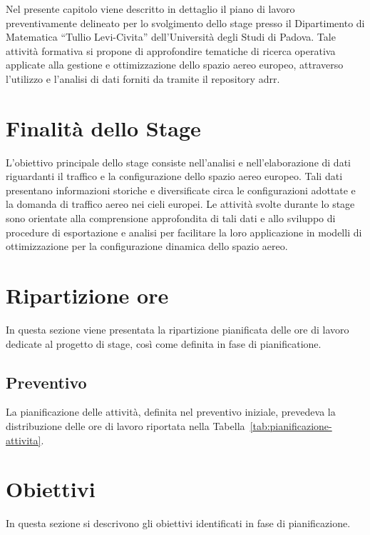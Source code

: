 Nel presente capitolo viene descritto in dettaglio il piano di lavoro preventivamente delineato per lo svolgimento dello stage presso il Dipartimento di Matematica ``Tullio Levi-Civita'' dell'Università degli Studi di Padova. Tale attività formativa si propone di approfondire tematiche di ricerca operativa applicate alla gestione e ottimizzazione dello spazio aereo europeo, attraverso l'utilizzo e l'analisi di dati forniti da \citet{eurocontrol2025} tramite il repository \gls{adrr}.

\section{Finalità dello Stage}
L'obiettivo principale dello stage consiste nell'analisi e nell'elaborazione di dati riguardanti il traffico e la configurazione dello spazio aereo europeo. Tali dati presentano informazioni storiche e diversificate circa le configurazioni adottate e la domanda di traffico aereo nei cieli europei. Le attività svolte durante lo stage sono orientate alla comprensione approfondita di tali dati e allo sviluppo di procedure di esportazione e analisi per facilitare la loro applicazione in modelli di ottimizzazione per la configurazione dinamica dello spazio aereo.

\newpage
\section{Ripartizione ore}
In questa sezione viene presentata la ripartizione pianificata delle ore di lavoro dedicate al progetto di stage, così come definita in fase di pianificatione.
\subsection{Preventivo}
La pianificazione delle attività, definita nel preventivo iniziale, prevedeva la distribuzione delle ore di lavoro riportata nella Tabella~\ref{tab:pianificazione-attivita}.
\begin{center}
    
\end{center}
\clearpage

\section{Obiettivi}
In questa sezione si descrivono gli obiettivi identificati in fase di pianificazione.
\label{sec:obbiettivi}
